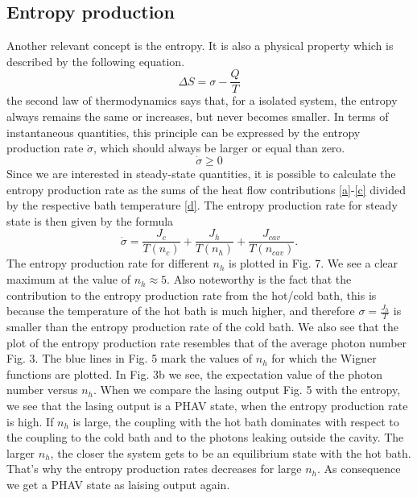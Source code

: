 \documentclass[12pt,a4paper]{article}
\begin{document}
\subsection{Entropy production}
Another relevant concept is the entropy. It is also a physical property which is described by the following equation.  
\begin{equation}
\Delta S = \sigma-\frac{Q}{T}
\end{equation} 
the second law of thermodynamics says that, for a isolated system, the entropy always remains the same or increases, but never becomes smaller. In terms of instantaneous quantities, this principle can be expressed by the entropy production rate $\dot \sigma$, which should always be larger or equal than zero.
\begin{equation}
\dot{\sigma}\geq 0
\end{equation}
Since we are interested in steady-state quantities, it is possible to calculate the entropy production rate as the sums of the heat flow contributions \eqref{a}-\eqref{c} divided by the respective bath temperature \eqref{d}.
The entropy production rate for steady state is then given by the formula
\begin{equation}
 \dot{\sigma} =\frac{J_c}{T(n_c)}+\frac{J_h}{T(n_h)}+\frac{J_{cav}}{T(n_{cav})}.\label{666}
 \end{equation}
The entropy production rate for different $n_h$ is plotted in Fig. 7. We see a clear maximum at the value of $n_h \approx 5$.  Also noteworthy is the fact that the contribution to the entropy production rate from the hot/cold bath, this is because the temperature of the hot bath is much higher, and therefore $\sigma=\frac{J_h}{T}$ is smaller than the entropy production rate of the cold bath. 
We also see that the plot of  the entropy production rate resembles that of the average  photon number Fig. 3.
The blue lines in Fig. 5 mark the values of $ n_h$ for which the Wigner functions are plotted. In Fig. 3b we see, the expectation value of the photon number versus $n_h$. When we compare the lasing output Fig. 5 with the entropy, we see that the lasing output is a PHAV state, when the entropy production rate is high. 
If $n_h$ is large, the coupling with the hot bath dominates with respect to the coupling to the cold bath and to the photons leaking outside the cavity. The larger $n_h$, the closer the system gets to be an equilibrium state with the hot bath. That's why the entropy production rates decreases for large  $n_h$. As consequence we get a PHAV state as laising output again.
\end{document}
